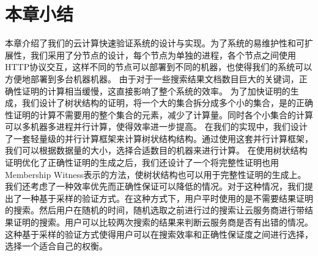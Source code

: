 \section{本章小结}
本章介绍了我们的云计算快速验证系统的设计与实现。为了系统的易维护性和可扩展性，我们采用了分节点的设计，每个节点为单独的进程，各个节点之间使用HTTP协议交互，这样不同的节点可以部署到不同的机器，也使得我们的系统可以方便地部署到多台机器机器。
由于对于一些搜索结果文档数目巨大的关键词，正确性证明的计算相当缓慢，这直接影响了整个系统的效率。
为了加快证明的生成，我们设计了树状结构的证明，将一个大的集合拆分成多个小的集合，是的正确性证明的计算不需要用的整个集合的元素，减少了计算量。同时各个小集合的计算可以多机器多进程并行计算，使得效率进一步提高。
在我们的实现中，我们设计了一套轻量级的并行计算框架来计算树状结构结构。通过使用这套并行计算框架，我们可以根据数据量的大小，选择合适数目的机器来进行计算。
在使用树状结构证明优化了正确性证明的生成之后，我们还设计了一个将完整性证明也用Membership Witness表示的方法，使树状结构也可以用于完整性证明的生成上。
我们还考虑了一种效率优先而正确性保证可以降低的情况。对于这种情况，我们提出了一种基于采样的验证方式。在这种方式下，用户平时使用的是不需要结果证明的搜索。然后用户在随机的时间，随机选取之前进行过的搜索让云服务商进行带结果证明的搜索。用户可以比较两次搜索的结果来判断云服务商是否有出错的情况。这种基于采样的验证方式使得用户可以在搜索效率和正确性保证度之间进行选择，选择一个适合自己的权衡。
